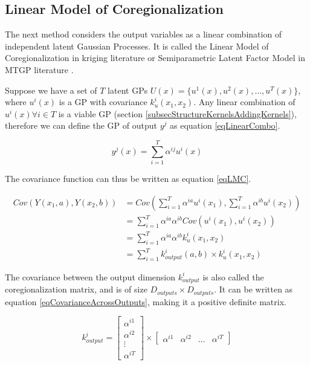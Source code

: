 \subsection{Linear Model of Coregionalization}\label{subsecLMC}
The next method considers the output variables as a linear combination of independent latent Gaussian Processes. It is called the Linear Model of Coregionalization in kriging literature \cite{goovaerts1997geostatistics} or Semiparametric Latent Factor Model in MTGP literature \cite{seeger2005semiparametric}. 

Suppose we have a set of $T$ latent GPs $U(x) = \{u^{1}(x), u^2(x), \ldots, u^{T}(x)\}$, where $u^{i}(x)$ is a GP with covariance $k_{u}^{i}(x_{1}, x_{2})$. Any linear combination of $u^{i}(x) \forall i \in T$ is a viable GP (section \ref{subsecStructureKernelsAddingKernels}), therefore we can define the GP of output $y^{j}$ as equation \ref{eqLinearCombo}. 

\begin{equation}\label{eqLinearCombo}
y^{j}(x) = \sum_{i=1}^{T} \alpha^{ij}u^{i}(x)
\end{equation}

The covariance function can thus be written as equation \ref{eqLMC}.

\begin{equation} 
 \begin{aligned}
Cov(Y(x_{1}, a), Y(x_{2}, b)) & = Cov(\sum_{i=1}^{T} \alpha^{ia}u^{i}(x_{1}), \sum_{i=1}^{T} \alpha^{ib}u^{i}(x_{2})) \\ 
& = \sum_{i=1}^{T} \alpha^{ia}\alpha^{ib} Cov(u^{i}(x_{1}), u^{i}(x_{2})) \\ 
& = \sum_{i=1}^{T} \alpha^{ia}\alpha^{ib}k_{u}^{i}(x_{1}, x_{2}) \\ 
& = \sum_{i=1}^{T} k_{output}^{i}(a, b) \times k_{u}^{i}(x_{1}, x_{2})
 \end{aligned}
\end{equation}

The covariance between the output dimension $k_{output}^{i}$ is also called the coregionalization matrix, and is of size $D_{outputs} \times D_{outputs}$. It can be written as equation \ref{eqCovarianceAcrossOutputs}, making it a positive definite matrix.

\begin{equation}\label{eqCovarianceAcrossOutputs}
k_{output}^{i} = \begin{bmatrix}
\alpha^{i1}\\ 
\alpha^{i2}\\ 
\vdots\\ 
\alpha^{iT}
\end{bmatrix} \times \begin{bmatrix}
\alpha^{i1} & \alpha^{i2} & \ldots & \alpha^{iT}
\end{bmatrix}
\end{equation}

